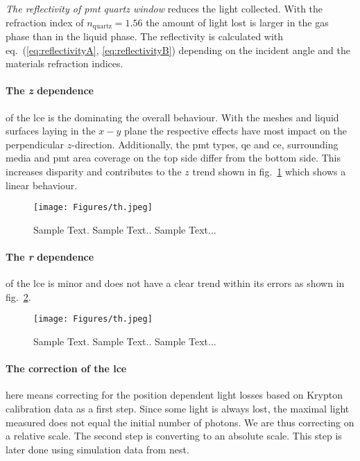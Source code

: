 \emph{The reflectivity of \gls{pmt} quartz window} reduces the light collected. With the refraction index of $ n_\mathrm{quartz} = 1.56 $ the amount of light lost is larger in the gas phase than in the liquid phase. The reflectivity is calculated with eq.~(\ref{eq:reflectivityA}, \ref{eq:reflectivityB}) depending on the incident angle and the materials refraction indices.


\paragraph{The \emph{z} dependence} of the \gls{lce} is the dominating the overall behaviour.
With the meshes and liquid surfaces laying in the $ x-y $ plane the respective effects have most impact on the perpendicular $ z $-direction.
Additionally, the \gls{pmt} types, \gls{qe} and \gls{ce}, surrounding media and \gls{pmt} area coverage on the top side differ from the bottom side.
This increases disparity and contributes to the $ z $ trend shown in fig.~\ref{fig:ce_vs_z} which shows a linear behaviour.


\begin{figure}
\centering
\texttt{[image: Figures/th.jpeg]}  %
\caption[Collection Efficiency in z]{
        Sample Text.
        Sample Text..
        Sample Text...
    }
\label{fig:ce_vs_z}
\end{figure}

\paragraph{The \emph{r} dependence} of the \gls{lce} is minor and does not have a clear trend within its errors as shown in fig.~\ref{fig:ce_vs_r}.

\begin{figure}
\centering
    \texttt{[image: Figures/th.jpeg]}  %
\caption[Collection Efficiency in r]{
        Sample Text.
        Sample Text..
        Sample Text...
    }
\label{fig:ce_vs_r}
\end{figure}

\paragraph{The correction of the \gls{lce}} here means correcting for the position dependent light losses based on Krypton calibration data as a first step.
Since some light is always lost, the maximal light measured does not equal the initial number of photons.
We are thus correcting on a relative scale.
The second step is converting to an absolute scale.
This step is later done using simulation data from \gls{nest}.

